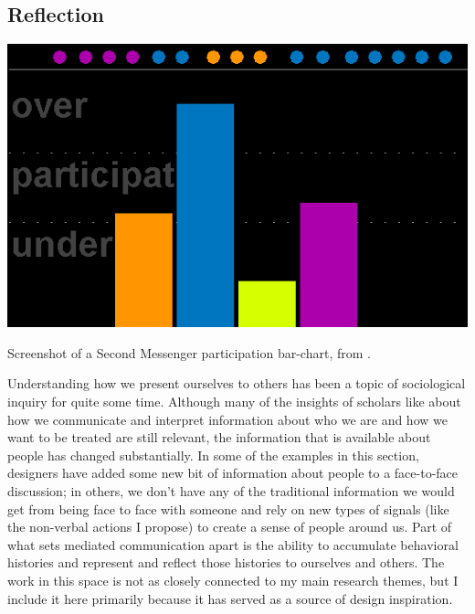 
\subsection{Reflection}

\begin{marginfigure}
	\includegraphics{figures/second-messenger.png}
	\caption{Screenshot of a Second Messenger participation bar-chart, from \citep{DiMicco:2007ie}.}
	\label{fig:second-messenger}
\end{marginfigure}





Understanding how we present ourselves to others has been a topic of sociological inquiry for quite some time. Although many of the insights of scholars like \citet{goffman_presentation_1959} about how we communicate and interpret information about who we are and how we want to be treated are still relevant, the information that is available about people has changed substantially. In some of the examples in this section, designers have added some new bit of information about people to a face-to-face discussion; in others, we don't have any of the traditional information we would get from being face to face with someone and rely on new types of signals (like the non-verbal actions I propose) to create a sense of people around us. Part of what sets mediated communication apart is the ability to accumulate behavioral histories and represent and reflect those histories to ourselves and others. The work in this space is not as closely connected to my main research themes, but I include it here primarily because it has served as a source of design inspiration. 



